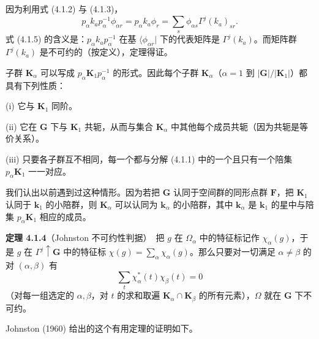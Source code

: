 因为利用式 (4.1.2) 与 (4.1.3)，
\begin{equation*}
p_{\alpha}k_{a}p^{-1}_{\alpha}\phi_{\alpha r} = p_{\alpha}k_{a}\phi_{r} = \sum_{s}\phi_{\alpha s}\Gamma^{j}(k_{a})_{sr}.
\tag{4.1.5}
\end{equation*}
式 (4.1.5) 的含义是：$p_{\alpha}k_{a}p^{-1}_{\alpha}$ 在基 $\langle \phi_{\alpha r} |$ 下的代表矩阵是 $\Gamma^{j}(k_{a})$。而矩阵群 $\Gamma^{j}(k_{a})$ 是不可约的（按定义），定理得证。

子群 $\mathbf{K}_{\alpha}$ 可以写成 $p_{\alpha}\mathbf{K}_{1}p^{-1}_{\alpha}$ 的形式。因此每个子群 $\mathbf{K}_{\alpha}$（$\alpha = 1$ 到 $|\mathbf{G}|/|\mathbf{K}_{1}|$）都具有下列性质：

(i) 它与 $\mathbf{K}_{1}$ 同阶。

(ii) 它在 $\mathbf{G}$ 下与 $\mathbf{K}_{1}$ 共轭，从而与集合 $\mathbf{K}_{\alpha}$ 中其他每个成员共轭（因为共轭是等价关系）。

(iii) 只要各子群互不相同，每一个都与分解 (4.1.1) 中的一个且只有一个陪集 $p_{\alpha}\mathbf{K}_{1}$ 一一对应。

我们认出以前遇到过这种情形。因为若把 $\mathbf{G}$ 认同于空间群的同形点群 $\mathbf{F}$，把 $\mathbf{K}_{1}$ 认同于 $\mathbf{k}_{1}$ 的小陪群，则 $\mathbf{K}_{\alpha}$ 可以认同为 $\mathbf{k}_{\alpha}$ 的小陪群，其中 $\mathbf{k}_{\alpha}$ 是 $\mathbf{k}_{1}$ 的星中与陪集 $p_{\alpha}\mathbf{K}_{1}$ 相应的成员。

\noindent\textbf{定理 4.1.4}\quad （Johnston 不可约性判据）\ 把 $g$ 在 $\Omega_{\alpha}$ 中的特征标记作 $\chi_{\alpha}(g)$，于是 $g$ 在 $\Gamma^{j} \uparrow \mathbf{G}$ 中的特征标 $\chi(g) = \sum_{\alpha}\chi_{\alpha}(g)$。那么只要对一切满足 $\alpha \neq \beta$ 的对 $(\alpha, \beta)$ 有
\begin{equation*}
\sum_{t}\chi^{*}_{\alpha}(t)\chi_{\beta}(t) = 0
\tag{4.1.6}
\end{equation*}
（对每一组选定的 $\alpha, \beta$，对 $t$ 的求和取遍 $\mathbf{K}_{\alpha} \cap \mathbf{K}_{\beta}$ 的所有元素），$\Omega$ 就在 $\mathbf{G}$ 下不可约。

Johnston (1960) 给出的这个有用定理的证明如下。

